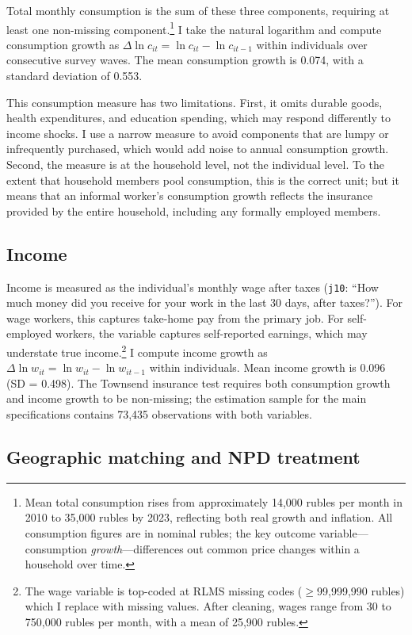 \documentclass[12pt]{article}
\begin{document}
\noindent Total monthly consumption is the sum of these three components, requiring at least one non-missing component.\footnote{Mean total consumption rises from approximately 14,000 rubles per month in 2010 to 35,000 rubles by 2023, reflecting both real growth and inflation. All consumption figures are in nominal rubles; the key outcome variable---consumption \textit{growth}---differences out common price changes within a household over time.} I take the natural logarithm and compute consumption growth as $\Delta \ln c_{it} = \ln c_{it} - \ln c_{it-1}$ within individuals over consecutive survey waves. The mean consumption growth is 0.074, with a standard deviation of 0.553.

This consumption measure has two limitations. First, it omits durable goods, health expenditures, and education spending, which may respond differently to income shocks. I use a narrow measure to avoid components that are lumpy or infrequently purchased, which would add noise to annual consumption growth. Second, the measure is at the household level, not the individual level. To the extent that household members pool consumption, this is the correct unit; but it means that an informal worker's consumption growth reflects the insurance provided by the entire household, including any formally employed members.

\subsection{Income}

Income is measured as the individual's monthly wage after taxes (\texttt{j10}: ``How much money did you receive for your work in the last 30 days, after taxes?''). For wage workers, this captures take-home pay from the primary job. For self-employed workers, the variable captures self-reported earnings, which may understate true income.\footnote{The wage variable is top-coded at RLMS missing codes ($\geq$99,999,990 rubles) which I replace with missing values. After cleaning, wages range from 30 to 750,000 rubles per month, with a mean of 25,900 rubles.} I compute income growth as $\Delta \ln w_{it} = \ln w_{it} - \ln w_{it-1}$ within individuals. Mean income growth is 0.096 (SD = 0.498). The Townsend insurance test requires both consumption growth and income growth to be non-missing; the estimation sample for the main specifications contains 73,435 observations with both variables.

\subsection{Geographic matching and NPD treatment}
\end{document}
